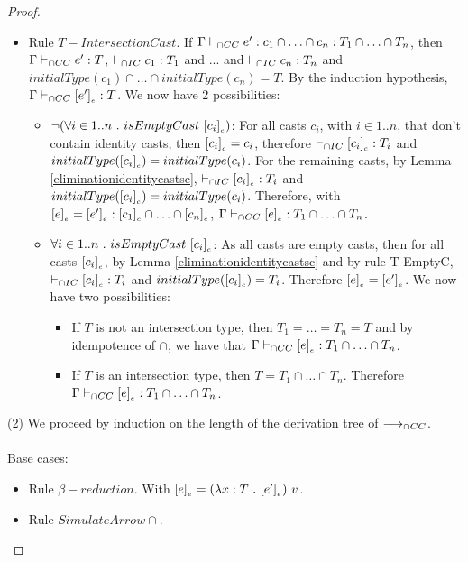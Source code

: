 \documentclass[a4paper]{article}
\begin{document}
\begin{proof}
\begin{itemize}
\begin{itemize}
    \end{itemize}
    \item Rule $T{-}IntersectionCast$.
    If $\Gamma \vdash_{\cap CC} e' : c_1 \cap \ldots \cap c_n : T_1 \cap \ldots \cap T_n$, then $\Gamma \vdash_{\cap CC} e' : T$, $\vdash_{\cap IC} c_1 : T_1$ and ... and $\vdash_{\cap IC} c_n : T_n$ and $initialType(c_1) \cap \ldots \cap initialType(c_n) = T$.
    By the induction hypothesis, $\Gamma \vdash_{\cap CC} [e']_{_e} : T$.
    We now have 2 possibilities:
    \begin{itemize}
        \item $\neg(\forall i \in 1..n\ .\ isEmptyCast\ \erasec{c_i})$:
        For all casts $c_i$, with $i \in 1..n$, that don't contain identity casts, then $[c_i]_{_c} = c_i$, therefore $\vdash_{\cap IC} [c_i]_{_c} : T_i$ and $initialType([c_i]_{_c}) = initialType(c_i)$.
        For the remaining casts, by Lemma \ref{eliminationidentitycastsc}, $\vdash_{\cap IC} [c_i]_{_c} : T_i$ and $initialType([c_i]_{_c}) = initialType(c_i)$.
        Therefore, with $[e]_{_e} = [e']_{_e} : [c_1]_{_c} \cap \ldots \cap [c_n]_{_c}$, $\Gamma \vdash_{\cap CC} [e]_{_e} : T_1 \cap \ldots \cap T_n$.
        \item $\forall i \in 1..n\ .\ isEmptyCast\ \erasec{c_i}$:
        As all casts are empty casts, then for all casts $[c_i]_{_c}$, by Lemma \ref{eliminationidentitycastsc} and by rule T-EmptyC, $\vdash_{\cap IC} [c_i]_{_c} : T_i$ and $initialType([c_i]_{_c}) = T_i$.
        Therefore $[e]_{_e} = [e']_{_e}$.
        We now have two possibilities:
        \begin{itemize}
            \item If $T$ is not an intersection type, then $T_1 = \ldots = T_n = T$ and by idempotence of $\cap$, we have that $\Gamma \vdash_{\cap CC} [e]_{_e} : T_1 \cap \ldots \cap T_n$.
            \item If $T$ is an intersection type, then $T = T_1 \cap \ldots \cap T_n$.
            Therefore $\Gamma \vdash_{\cap CC} [e]_{_e} : T_1 \cap \ldots \cap T_n$.
        \end{itemize}
    \end{itemize}
\end{itemize}
(2) We proceed by induction on the length of the derivation tree of $\longrightarrow_{\cap CC}$.\\\\
Base cases:
\begin{itemize}
    \item Rule $\beta{-}reduction$.
    With $\erasee{e} = (\lambda x : T\ .\ \erasee{e'})\ v$.
    \item Rule $SimulateArrow{\cap}$.

\end{itemize}
\end{proof}
\end{document}
